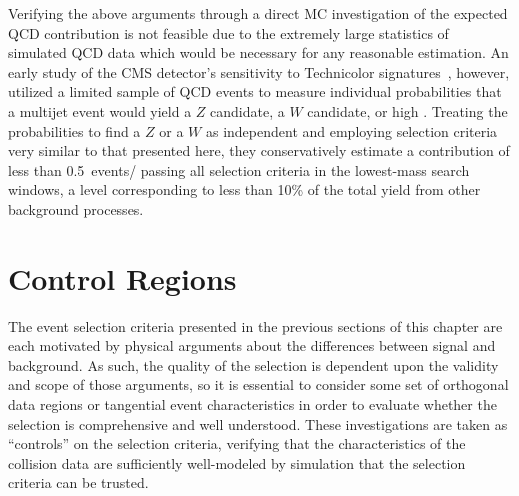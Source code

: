 Verifying the above arguments through a direct MC investigation of the expected QCD contribution is not feasible due to the extremely large statistics of simulated QCD data which would be necessary for any reasonable estimation.  An early study of the CMS detector's sensitivity to Technicolor signatures~\cite{CMS-PAS-EXO-09-007}, however, utilized a limited sample of QCD events to measure individual probabilities that a multijet event would yield a $Z$ candidate, a $W$ candidate, or high \lepht.  Treating the probabilities to find a $Z$ or a $W$ as independent and employing selection criteria very similar to that presented here, they conservatively estimate a contribution of less than \SI{0.5}{events/\fbinv} passing all selection criteria in the lowest-mass search windows, a level corresponding to less than 10\% of the total yield from other background processes.

\section{Control Regions}
\label{sec:control-regions}

The event selection criteria presented in the previous sections of this chapter are each motivated by physical arguments about the differences between signal and background.  As such, the quality of the selection is dependent upon the validity and scope of those arguments, so it is essential to consider some set of orthogonal data regions or tangential event characteristics in order to evaluate whether the selection is comprehensive and well understood.  These investigations are taken as ``controls'' on the selection criteria, verifying that the characteristics of the collision data are sufficiently well-modeled by simulation that the selection criteria can be trusted.

